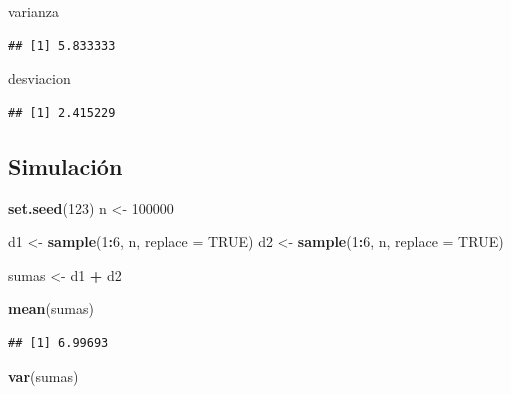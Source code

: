 \documentclass[
]{article}
\newenvironment{Shaded}{\begin{snugshade}}{\end{snugshade}}
\newcommand{\AttributeTok}[1]{\textcolor[rgb]{0.13,0.29,0.53}{#1}}
\newcommand{\ConstantTok}[1]{\textcolor[rgb]{0.56,0.35,0.01}{#1}}
\newcommand{\DecValTok}[1]{\textcolor[rgb]{0.00,0.00,0.81}{#1}}
\newcommand{\FunctionTok}[1]{\textcolor[rgb]{0.13,0.29,0.53}{\textbf{#1}}}
\newcommand{\NormalTok}[1]{#1}
\newcommand{\OtherTok}[1]{\textcolor[rgb]{0.56,0.35,0.01}{#1}}
\newcommand{\SpecialCharTok}[1]{\textcolor[rgb]{0.81,0.36,0.00}{\textbf{#1}}}
\begin{document}
\begin{Shaded}
\begin{Highlighting}[]
\NormalTok{varianza}
\end{Highlighting}
\end{Shaded}

\begin{verbatim}
## [1] 5.833333
\end{verbatim}

\begin{Shaded}
\begin{Highlighting}[]
\NormalTok{desviacion}
\end{Highlighting}
\end{Shaded}

\begin{verbatim}
## [1] 2.415229
\end{verbatim}

\subsection{Simulación}\label{simulaciuxf3n-1}

\begin{Shaded}
\begin{Highlighting}[]
\FunctionTok{set.seed}\NormalTok{(}\DecValTok{123}\NormalTok{)}
\NormalTok{n }\OtherTok{\textless{}{-}} \DecValTok{100000}

\NormalTok{d1 }\OtherTok{\textless{}{-}} \FunctionTok{sample}\NormalTok{(}\DecValTok{1}\SpecialCharTok{:}\DecValTok{6}\NormalTok{, n, }\AttributeTok{replace =} \ConstantTok{TRUE}\NormalTok{)}
\NormalTok{d2 }\OtherTok{\textless{}{-}} \FunctionTok{sample}\NormalTok{(}\DecValTok{1}\SpecialCharTok{:}\DecValTok{6}\NormalTok{, n, }\AttributeTok{replace =} \ConstantTok{TRUE}\NormalTok{)}

\NormalTok{sumas }\OtherTok{\textless{}{-}}\NormalTok{ d1 }\SpecialCharTok{+}\NormalTok{ d2}

\FunctionTok{mean}\NormalTok{(sumas)}
\end{Highlighting}
\end{Shaded}

\begin{verbatim}
## [1] 6.99693
\end{verbatim}

\begin{Shaded}
\begin{Highlighting}[]
\FunctionTok{var}\NormalTok{(sumas)}
\end{Highlighting}
\end{Shaded}
\end{document}
